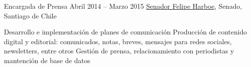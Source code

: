 \begin{joblist}[13.2][7.8][3.4]
\item[Encargada de Prensa]{Abril 2014 -- Marzo 2015}
    {
    \href{https://www.harboe.cl/}{Senador Felipe Harboe}, Senado, Santiago de Chile
    }
    {
        \iftbftiny \vspace{-0.5cm} \fi
        \begin{itemize}
            \iftbftiny \setlength\itemsep{-3pt} \fi
            \cvitem[\checkmark] Desarrollo e implementación de planes de comunicación 
            \cvitem[\checkmark] Producción de contenido digital y editorial: comunicados, notas, breves, mensajes para redes sociales, newsletters, entre otros
            \cvitem[\checkmark] Gestión de prensa, relacionamiento con periodistas y mantención de base de datos
            
        \end{itemize}
    }


\end{joblist}


%
%


